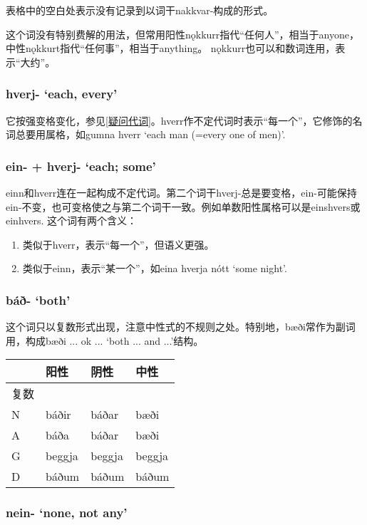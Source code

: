 表格中的空白处表示没有记录到以词干nakkvar-构成的形式。

这个词没有特别费解的用法，但常用阳性nǫkkurr指代“任何人”，相当于anyone，中性nǫkkurt指代“任何事”，相当于anything。 nǫkkurr也可以和数词连用，表示“大约”。

\subsubsection{hverj- `each, every‌'}

它按强变格变化，参见\ref{疑问代词}。hverr作不定代词时表示``每一个''，它修饰的名词总要用属格，如gumna hverr `each man (=every one of men)'.

\subsubsection{ein- + hverj- `each; some‌'}

einn和hverr连在一起构成不定代词。第二个词干hverj-总是要变格，ein-可能保持ein-不变，也可变格使之与第二个词干一致。例如单数阳性属格可以是einshvers或einhvers. 这个词有两个含义：

\begin{enumerate}
    \item
          类似于hverr，表示``每一个''，但语义更强。
    \item
          类似于einn，表示``某一个''，如eina hverja nótt `some night'.
\end{enumerate}

\subsubsection{báð- `both‌'}
这个词只以复数形式出现，注意中性式的不规则之处。特别地，bæði常作为副词用，构成bæði ... ok ... `both ... and ...'结构。

\begin{longtable}{llll}
    \toprule
         & 阳性   & 阴性   & 中性   \\
    \midrule
    \endhead
    \bottomrule
    \endfoot
    复数 &        &        &        \\
    N    & báðir  & báðar  & bæði   \\
    A    & báða   & báðar  & bæði   \\
    G    & beggja & beggja & beggja \\
    D    & báðum  & báðum  & báðum  \\
\end{longtable}

\subsubsection{nein- `none, not any‌'}

